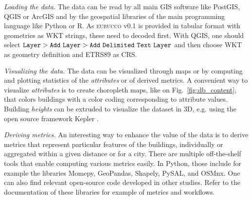 \documentclass[fleqn,10pt]{wlscirep}
\begin{document}
\medskip \noindent \textit{Loading the data.} \hspace{0.1cm}
The data can be read by all main GIS software like PostGIS, QGIS or ArcGIS and by the geospatial libraries of the main programming language like Python or R. As  \textsc{eubucco} v0.1 is provided in tabular format with geometries as WKT strings, these need to decoded first. With QGIS, one should select ${\tt Layer > Add\ Layer > Add\ Delimited\ Text\ Layer}$ and then choose WKT as geometry definition and ETRS89 as CRS.

\medskip \noindent \textit{Visualizing the data.} \hspace{0.1cm} 
The data can be visualized through maps or by computing and plotting statistics of the \textit{attributes} or of derived metrics. A convenient way to visualize \textit{attributes} is to create choropleth maps, like on Fig.~\ref{fig:db_content}, that colors buildings with a color coding corresponding to attribute values. Building \textit{heights} can be extruded to visualize the dataset in 3D, e.g. using the open source framework Kepler \cite{kepler2021}. 

\medskip \noindent \textit{Deriving metrics.} \hspace{0.1cm} 
An interesting way to enhance the value of the data is to derive metrics that represent particular features of the buildings, individually or aggregated within a given distance or for a city. There are multiple off-the-shelf tools that enable computing various metrics easily. In Python, those include for example the libraries Momepy\cite{fleischmann2019momepy}, GeoPandas\cite{kelsey_jordahl_2019_2585849}, Shapely\cite{gillies_2021}, PySAL\cite{rey2010pysal}, and OSMnx\cite{boeing2017osmnx}. One can also find relevant open-source code developed in other studies\cite{2022_ceus_gbmi,milojevic2020learning}. Refer to the documentation of these libraries for example of metrics and workflows.
\end{document}
